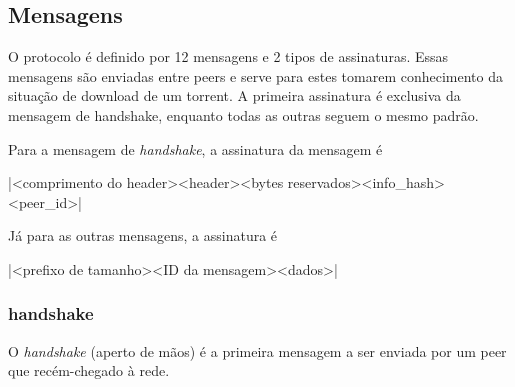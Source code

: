 \subsection*{Mensagens}

O protocolo é definido por 12 mensagens e 2 tipos de assinaturas. Essas mensagens são
enviadas entre \glspl*{peer} e serve para estes tomarem conhecimento da situação de
download de um \gls*{torrent}. A primeira assinatura é exclusiva da mensagem de
handshake, enquanto todas as outras seguem o mesmo padrão.

Para a mensagem de \emph{handshake}, a assinatura da mensagem é

\bverb|<comprimento do header><header><bytes reservados><info_hash><peer_id>|

Já para as outras mensagens, a assinatura é

\bverb|<prefixo de tamanho><ID da mensagem><dados>|

\subsubsection*{handshake}

O \emph{handshake} (aperto de mãos) é a primeira mensagem a ser enviada por um
\gls*{peer} que recém-chegado à rede.

